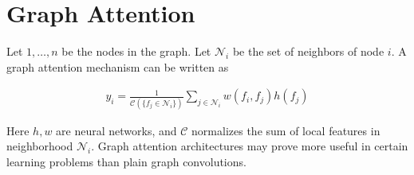 \documentclass[book.tex]{subfiles}
\begin{document}

    
%
%


\section{Graph Attention}

Let $1,\dotsc,n$ be the nodes in the graph. Let $\mathcal{N}_i$ be the set of neighbors of node $i$. A graph attention mechanism can be written as 

\begin{align}
    y_i = \frac{1}{\mathcal{C}(\{f_j \in \mathcal{N}_i\})} \sum_{j \in \mathcal{N}_i} w(f_i, f_j) h(f_j)
\end{align}

Here $h, w$ are neural networks, and $\mathcal{C}$ normalizes the sum of local features in neighborhood $\mathcal{N}_i$. Graph attention architectures may prove more useful in certain learning problems than plain graph convolutions.
\end{document}
